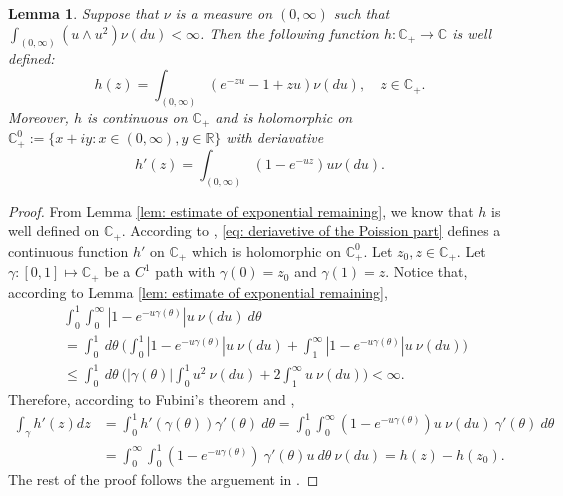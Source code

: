\documentclass[12pt]{amsart}
\theoremstyle{plain}
\newtheorem{lem}[thm]{Lemma}
\theoremstyle{definition}
\numberwithin{equation}{section}
\begin{document}
\begin{lem}
\label{lem: extension lemma for branching mechanism}
    Suppose that  $\nu$ is a measure on $(0,\infty)$ such that $\int_{(0,\infty)} (u \wedge u^2) \nu(du)< \infty$. Then the following function $h: \mathbb C_+ \to \mathbb C$ is well defined:
\begin{equation}
    h (z) = \int_{(0,\infty)} (e^{-zu} - 1 + zu) \nu(du), \quad z \in \mathbb C_+.
\end{equation}
    Moreover, $h$ is continuous on $\mathbb C_+$ and is holomorphic on $\mathbb C_+^0:=\{x+iy:x \in (0,\infty), y\in \mathbb R\}$ with deriavative
\begin{equation}
\label{eq: deriavetive of the Poission part}
    h'(z) = \int_{(0,\infty)}(1- e^{-uz})u \nu(du).
\end{equation}
\end{lem}
\begin{proof}
    From Lemma \ref{lem: estimate of exponential remaining}, we know that $h$ is well defined on $\mathbb C_+$.
    According to \cite[Theorem 3.2. \& Theorem 3.5.]{SchillingSongVondracek2010Bernstein}, \eqref{eq: deriavetive of the Poission part} defines a continuous function $h'$ on $\mathbb C_+$ which is holomorphic on $\mathbb C_+^0$.
    Let $z_0, z \in \mathbb C_+$.
    Let $\gamma: [0,1]\mapsto \mathbb C_+$ be a $C^1$ path with $\gamma(0) = z_0$ and $\gamma(1) = z$.
    Notice that, according to Lemma \ref{lem: estimate of exponential remaining},
\begin{align}
    &\int_0^1 \int_0^\infty |1-e^{-u\gamma(\theta)}|u~\nu(du)~d\theta
    \\ &= \int_0^1~d\theta~ \Big( \int_0^1 |1-e^{-u\gamma(\theta)}|u~\nu(du) + \int_1^\infty |1-e^{-u\gamma(\theta)}|u~\nu(du) \Big)
    \\ &\leq \int_0^1~d\theta~ \Big( |\gamma(\theta)|\int_0^1 u^2~\nu(du) + 2\int_1^\infty u~\nu(du) \Big)
    < \infty.
\end{align}
    Therefore, according to Fubini's theorem and \cite[Theorem 7.20.]{Rudin1987Real},
\begin{align}
\label{eq: path integration representation of h}
    \int_\gamma h'(z)dz
    &=\int_0^1 h'(\gamma(\theta))\gamma'(\theta) ~d\theta
    = \int_0^1 \int_0^\infty (1-e^{-u\gamma(
    \theta)}) u~\nu(du)~ \gamma'(\theta) ~d\theta
    \\&= \int_0^\infty \int_0^1 (1-e^{-u\gamma(
    \theta)})~ \gamma'(\theta) u ~d\theta~ \nu(du)
    = h(z) - h(z_0).
\end{align}
    The rest of the proof follows the arguement in \cite[Section 10.14]{Rudin1987Real}.
\end{proof}
\end{document}
